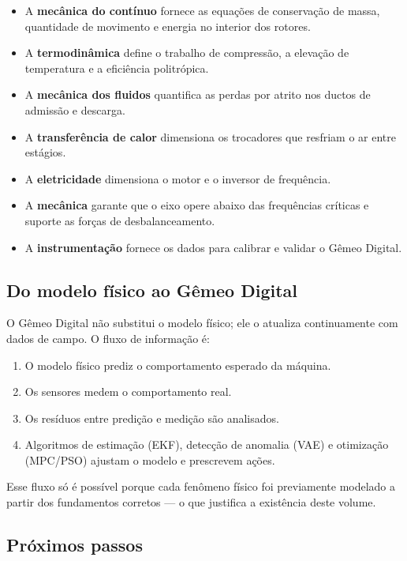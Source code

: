 \documentclass[12pt,a4paper]{article}
\numberwithin{equation}{section}
\numberwithin{table}{section}
\numberwithin{figure}{section}
\begin{document}
\begin{itemize}
\item A \textbf{mecânica do contínuo} fornece as equações de conservação de
  massa, quantidade de movimento e energia no interior dos rotores.
\item A \textbf{termodinâmica} define o trabalho de compressão, a elevação de
  temperatura e a eficiência politrópica.
\item A \textbf{mecânica dos fluidos} quantifica as perdas por atrito nos
  ductos de admissão e descarga.
\item A \textbf{transferência de calor} dimensiona os trocadores que
  resfriam o ar entre estágios.
\item A \textbf{eletricidade} dimensiona o motor e o inversor de frequência.
\item A \textbf{mecânica} garante que o eixo opere abaixo das frequências
  críticas e suporte as forças de desbalanceamento.
\item A \textbf{instrumentação} fornece os dados para calibrar e validar o
  Gêmeo Digital.
\end{itemize}

\subsection{Do modelo físico ao Gêmeo Digital}

O Gêmeo Digital não substitui o modelo físico; ele o atualiza continuamente
com dados de campo. O fluxo de informação é:
\begin{enumerate}
\item O modelo físico prediz o comportamento esperado da máquina.
\item Os sensores medem o comportamento real.
\item Os resíduos entre predição e medição são analisados.
\item Algoritmos de estimação (EKF), detecção de anomalia (VAE) e otimização
  (MPC/\-PSO) ajustam o modelo e prescrevem ações.
\end{enumerate}

Esse fluxo só é possível porque cada fenômeno físico foi previamente modelado
a partir dos fundamentos corretos — o que justifica a existência deste volume.

\subsection{Próximos passos}
\end{document}

